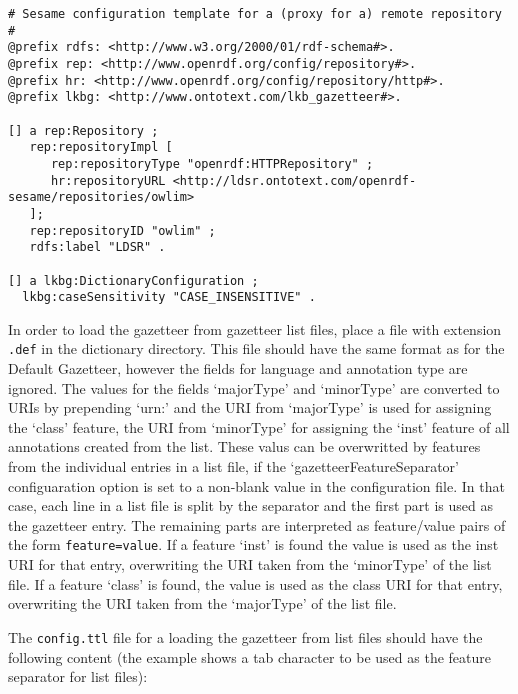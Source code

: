 \begin{pverbatimbox}
\begin{small}\begin{verbatim}
# Sesame configuration template for a (proxy for a) remote repository
#
@prefix rdfs: <http://www.w3.org/2000/01/rdf-schema#>.
@prefix rep: <http://www.openrdf.org/config/repository#>.
@prefix hr: <http://www.openrdf.org/config/repository/http#>.
@prefix lkbg: <http://www.ontotext.com/lkb_gazetteer#>.

[] a rep:Repository ;
   rep:repositoryImpl [
      rep:repositoryType "openrdf:HTTPRepository" ;
      hr:repositoryURL <http://ldsr.ontotext.com/openrdf-sesame/repositories/owlim>
   ];
   rep:repositoryID "owlim" ;
   rdfs:label "LDSR" .
   
[] a lkbg:DictionaryConfiguration ; 
  lkbg:caseSensitivity "CASE_INSENSITIVE" .  
\end{verbatim}\end{small}
\end{pverbatimbox}


In order to load the gazetteer from gazetteer list files,
place a file with extension \texttt{.def} in the dictionary
directory. This file should have the same format as for
the Default Gazetteer, however the fields for language and
annotation type are ignored. The values for the fields
`majorType' and `minorType' are converted to URIs by 
prepending `urn:' and the URI from `majorType' is used for
assigning the `class' feature, the URI from `minorType'
for assigning the `inst' feature of all annotations created
from the list. These valus can be overwritted by features
from the individual entries in a list file, if the
`gazetteerFeatureSeparator' configuaration option is set
to a non-blank value in the configuration file. In that
case, each line in a list file is split by the separator
and the first part is used as the gazetteer entry. The 
remaining parts are interpreted as feature/value pairs
of the form \texttt{feature=value}. If a feature `inst'
is found the value is used as the inst URI for that entry,
overwriting the URI taken from the `minorType' of the list
file. If a feature `class' is found, the value is used as
the class URI for that entry, overwriting the URI taken from
the `majorType' of the list file.

The \texttt{config.ttl} file for a loading the gazetteer
from list files should have the following content (the example
shows a tab character to be used as the feature separator
for list files):

